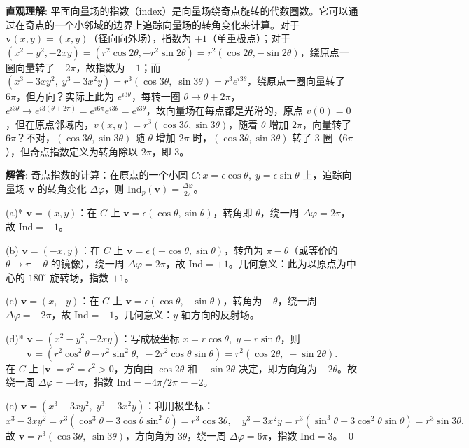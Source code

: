 \begin{solution}
\textbf{直观理解}: 平面向量场的指数（index）是向量场绕奇点旋转的代数圈数。它可以通过在奇点的一个小邻域的边界上追踪向量场的转角变化来计算。对于 $\mathbf{v}(x,y) = (x,y)$（径向向外场），指数为 $+1$（单重极点）；对于 $(x^2-y^2,-2xy) = (r^2\cos 2\theta, -r^2\sin 2\theta) = r^2(\cos 2\theta, -\sin 2\theta)$，绕原点一圈向量转了 $-2\pi$，故指数为 $-1$；而 $(x^3-3xy^2,\; y^3-3x^2y) = r^3(\cos 3\theta,\;\sin 3\theta) = r^3 e^{i3\theta}$，绕原点一圈向量转了 $6\pi$，但方向？实际上此为 $e^{i3\theta}$，每转一圈 $\theta\to\theta+2\pi$，$e^{i3\theta}\to e^{i3(\theta+2\pi)} = e^{i6\pi}e^{i3\theta} = e^{i3\theta}$，故向量场在每点都是光滑的，原点 $v(0)=0$，但在原点邻域内，$v(x,y) = r^3(\cos 3\theta, \sin 3\theta)$，随着 $\theta$ 增加 $2\pi$，向量转了 $6\pi$？不对，$(\cos 3\theta, \sin 3\theta)$ 随 $\theta$ 增加 $2\pi$ 时，$(\cos 3\theta, \sin 3\theta)$ 转了 $3$ 圈（$6\pi$），但奇点指数定义为转角除以 $2\pi$，即 $3$。

\textbf{解答}: 奇点指数的计算：在原点的一个小圆 $C: x = \epsilon\cos\theta,\; y=\epsilon\sin\theta$ 上，追踪向量场 $\mathbf{v}$ 的转角变化 $\Delta\varphi$，则 $\mathrm{Ind}_p(\mathbf{v}) = \frac{\Delta\varphi}{2\pi}$。

(a)* $\mathbf{v}=(x,y)$：在 $C$ 上 $\mathbf{v} = \epsilon(\cos\theta,\sin\theta)$，转角即 $\theta$，绕一周 $\Delta\varphi = 2\pi$，故 $\mathrm{Ind}=+1$。

(b) $\mathbf{v}=(-x,y)$：在 $C$ 上 $\mathbf{v} = \epsilon(-\cos\theta,\sin\theta)$，转角为 $\pi-\theta$（或等价的 $\theta\to\pi-\theta$ 的镜像），绕一周 $\Delta\varphi = 2\pi$，故 $\mathrm{Ind}=+1$。几何意义：此为以原点为中心的 $180^\circ$ 旋转场，指数 $+1$。

(c) $\mathbf{v}=(x,-y)$：在 $C$ 上 $\mathbf{v} = \epsilon(\cos\theta,-\sin\theta)$，转角为 $-\theta$，绕一周 $\Delta\varphi = -2\pi$，故 $\mathrm{Ind}=-1$。几何意义：$y$ 轴方向的反射场。

(d)* $\mathbf{v}=(x^2-y^2,-2xy)$：写成极坐标 $x=r\cos\theta,\; y=r\sin\theta$，则
\[
\mathbf{v} = (r^2\cos^2\theta - r^2\sin^2\theta,\; -2r^2\cos\theta\sin\theta) = r^2(\cos 2\theta,\; -\sin 2\theta).
\]
在 $C$ 上 $|\mathbf{v}| = r^2 = \epsilon^2 > 0$，方向由 $\cos 2\theta$ 和 $-\sin 2\theta$ 决定，即方向角为 $-2\theta$。故绕一周 $\Delta\varphi = -4\pi$，指数 $\mathrm{Ind} = -4\pi/2\pi = -2$。

(e) $\mathbf{v}=(x^3-3xy^2,\; y^3-3x^2y)$：利用极坐标：
\[
x^3-3xy^2 = r^3(\cos^3\theta - 3\cos\theta\sin^2\theta) = r^3\cos 3\theta,\quad
y^3-3x^2y = r^3(\sin^3\theta - 3\cos^2\theta\sin\theta) = r^3\sin 3\theta.
\]
故 $\mathbf{v} = r^3(\cos 3\theta,\;\sin 3\theta)$，方向角为 $3\theta$，绕一周 $\Delta\varphi = 6\pi$，指数 $\mathrm{Ind} = 3$。
\qed
\end{solution}

